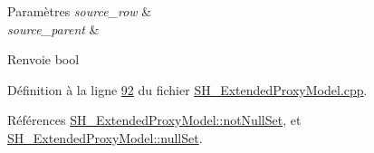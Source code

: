 \begin{DoxyParams}{Paramètres}
{\em source\-\_\-row} & \\
\hline
{\em source\-\_\-parent} & \\
\hline
\end{DoxyParams}
\begin{DoxyReturn}{Renvoie}
bool 
\end{DoxyReturn}


Définition à la ligne \hyperlink{SH__ExtendedProxyModel_8cpp_source_l00092}{92} du fichier \hyperlink{SH__ExtendedProxyModel_8cpp_source}{S\-H\-\_\-\-Extended\-Proxy\-Model.\-cpp}.



Références \hyperlink{classSH__ExtendedProxyModel_ac17eb2c65d47f6dc6dd322e0a39bbe3e}{S\-H\-\_\-\-Extended\-Proxy\-Model\-::not\-Null\-Set}, et \hyperlink{classSH__ExtendedProxyModel_a0a3818c6f8e4b73d1b5b47b2914cb56d}{S\-H\-\_\-\-Extended\-Proxy\-Model\-::null\-Set}.


